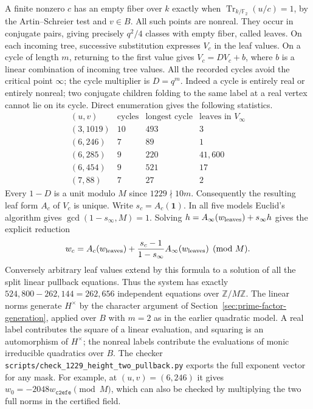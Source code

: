 \documentclass[11pt]{article}
\begin{document}
A finite nonzero \(c\) has an empty fiber over \(k\) exactly when
\(\operatorname{Tr}_{k/\mathbb F_2}(u/c)=1\), by the
Artin--Schreier test and \(v\in B\). All such points are nonreal.
They occur in conjugate pairs, giving precisely \(q^2/4\) classes
with empty fiber, called leaves. On each incoming tree, successive
substitution expresses \(V_c\) in the leaf values. On a cycle of length
\(m\), returning to the first value gives \(V_c=D V_c+b\), where
\(b\) is a linear combination of incoming tree values. All the recorded
cycles avoid the critical point \(\infty\); the cycle multiplier is
\(D=q^m\). Indeed a cycle is entirely real or entirely nonreal; two
conjugate children folding to the same label at a real vertex cannot
lie on its cycle. Direct enumeration gives the following statistics.
\[
\begin{array}{c|r|r|r}
(u,v)&\text{cycles}&\text{longest cycle}&\text{leaves in }V_\infty\\\hline
(3,1019)&10&493&3\\
(6,246)&7&89&1\\
(6,285)&9&220&41{,}600\\
(6,454)&9&521&17\\
(7,88)&7&27&2
\end{array}
\]
Every \(1-D\) is a unit modulo \(M\) since \(1229\nmid 10m\).
Consequently the resulting leaf form \(A_c\) of \(V_c\) is unique.
Write \(s_c=A_c(\mathbf1)\). In all five models Euclid's algorithm
gives \(\gcd(1-s_\infty,M)=1\). Solving
\(h=A_\infty(w_{\rm leaves})+s_\infty h\) gives the explicit reduction
\[
 w_c=A_c(w_{\rm leaves})+
      \frac{s_c-1}{1-s_\infty}A_\infty(w_{\rm leaves})\pmod M .
\]
Conversely arbitrary leaf values extend by this formula to a solution of
all the split linear pullback equations. Thus the system has exactly
\(524{,}800-262{,}144=262{,}656\) independent equations over
\(\mathbb Z/M\mathbb Z\). The linear norms generate \(H^\times\) by the
character argument of Section~\ref{sec:prime-factor-generation}, applied
over \(B\) with \(m=2\) as in the earlier quadratic model. A real label
contributes the square of a linear evaluation, and squaring is an
automorphism of \(H^\times\); the nonreal labels contribute the evaluations
of monic irreducible quadratics over \(B\).
The checker \nolinkurl{scripts/check_1229_height_two_pullback.py} exports
the full exponent vector for any mask. For example, at \((u,v)=(6,246)\)
it gives \(w_0=-2048w_{\mathtt{c2efe}}\pmod M\), which can also be checked
by multiplying the two full norms in the certified field.
\end{document}
